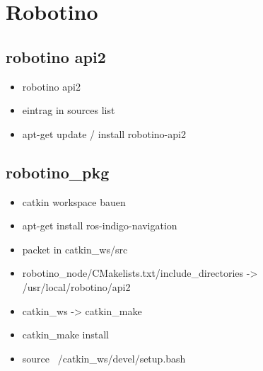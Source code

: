 	\section{Robotino}
		\subsection{robotino api2}
		\begin{itemize}
		\item robotino api2
		\item eintrag in sources list
		\item apt-get update / install robotino-api2
		\end{itemize}
		\subsection{robotino\_pkg}
		\begin{itemize}
		\item catkin workspace bauen
		\item apt-get install ros-indigo-navigation
		\item packet in catkin\_ws/src
		\item robotino\_node/CMakelists.txt/include\_directories -> /usr/local/robotino/api2
		\item catkin\_ws -> catkin\_make
		\item catkin\_make install
		\item source ~/catkin\_ws/devel/setup.bash
		\end{itemize}
		
		